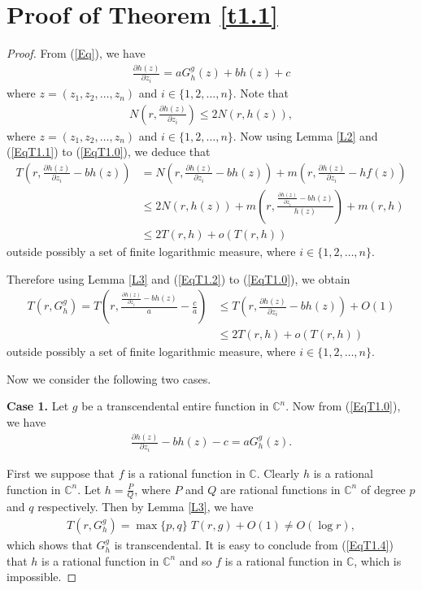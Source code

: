 \documentclass[11pt,reqno]{amsart}
\numberwithin{equation}{section}
\begin{document}
\section{{Proof of Theorem \ref{t1.1}}}
\begin{proof} From (\ref{Eq}), we have
\begin{align}\label{EqT1.0}
\frac{\partial h(z)}{\partial z_i}=aG^g_h(z)+bh(z)+c
\end{align}
where $z=(z_1,z_2,\ldots,z_n)$ and $i\in\{1,2,\ldots,n\}$. 
Note that
\begin{align}\label{EqT1.1}
N\left(r,\frac{\partial h(z)}{\partial z_i}\right)\leq 2N(r,h(z)),
\end{align}
where $z=(z_1,z_2,\ldots,z_n)$ and $i\in\{1,2,\ldots,n\}$.
Now using Lemma \ref{L2} and (\ref{EqT1.1}) to (\ref{EqT1.0}), we deduce that
\begin{align}\label{EqT1.2}
T\left(r,\frac{\partial h(z)}{\partial z_i}-bh(z)\right)&=N\left(r,\frac{\partial h(z)}{\partial z_i}-bh(z)\right)+m\left(r,\frac{\partial h(z)}{\partial z_i}-hf(z)\right)\\&\leq 
2N(r,h(z))+m\left(r,\frac{\frac{\partial h(z)}{\partial z_i}-bh(z)}{h(z)}\right)+m(r,h)\nonumber\\&\leq
2T(r,h)+o(T(r,h))\nonumber
\end{align}
outside possibly a set of finite logarithmic measure, where $i\in\{1,2,\ldots,n\}$.

Therefore using Lemma \ref{L3} and (\ref{EqT1.2}) to (\ref{EqT1.0}), we obtain
\begin{align}\label{EqT1.3}
T(r,G^g_h)=T\left(r, \frac{\frac{\partial h(z)}{\partial z_i}-bh(z)}{a}-\frac{c}{a}\right)&\leq T\left(r,\frac{\partial h(z)}{\partial z_i}-bh(z)\right)+O(1)\\&\leq 
2T(r,h)+o(T(r,h))\nonumber
\end{align}
outside possibly a set of finite logarithmic measure, where $i\in\{1,2,\ldots,n\}$.


Now we consider the following two cases.\par

\medskip
{\bf Case 1.} Let $g$ be a transcendental entire function in $\mathbb{C}^n$. Now from (\ref{EqT1.0}), we have 
\begin{align}\label{EqT1.4}
\frac{\partial h(z)}{\partial z_i}-bh(z)-c=aG^g_h(z).
\end{align}


\medskip
First we suppose that $f$ is a rational function in $\mathbb{C}$. Clearly $h$ is a rational function in $\mathbb{C}^n$. Let $h=\frac{P}{Q}$, where $P$ and $Q$ are rational functions in $\mathbb{C}^n$ of degree $p$ and $q$ respectively. Then by Lemma \ref{L3}, we have 
\begin{align*}
T(r, G^g_h)=\max\{p,q\}\;T(r,g)+O(1)\neq O(\log r),
\end{align*}
which shows that $G^g_h$ is transcendental. It is easy to conclude from (\ref{EqT1.4}) that $h$ is a rational function in $\mathbb{C}^n$ and so $f$ is a rational function in $\mathbb{C}$, which is impossible.



\end{proof}
\end{document}
